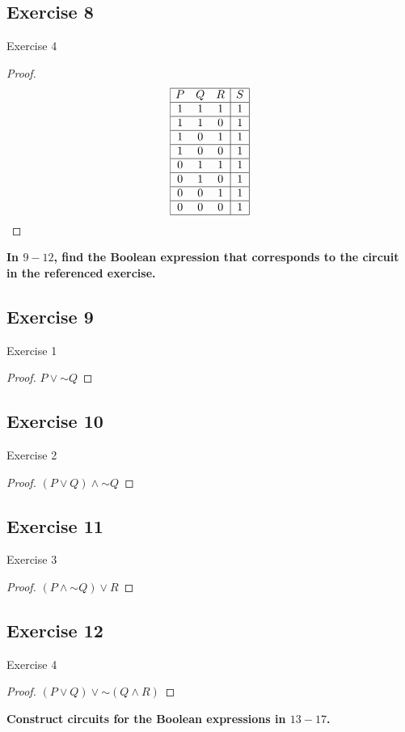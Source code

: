 \documentclass[14pt]{extarticle}
\begin{document}
\subsection{Exercise 8} Exercise 4
\begin{proof} $$ \begin{array}{|ccc|c|} \hline P&Q&R&S\\ \hline 1&1&1&1\\ \hline
1&1&0&1\\ \hline 1&0&1&1\\ \hline 1&0&0&1\\ \hline 0&1&1&1\\ \hline 0&1&0&1\\
\hline 0&0&1&1\\ \hline 0&0&0&1\\ \hline \end{array} $$ \end{proof}

{\bf \color{cyan} In $9-12$, find the Boolean expression that corresponds to the
circuit in the referenced exercise.}

\subsection{Exercise 9} Exercise 1
\begin{proof} $P \vee {\sim Q}$ \end{proof}
\subsection{Exercise 10} Exercise 2
\begin{proof} $(P \vee Q) \wedge {\sim Q}$ \end{proof}
\subsection{Exercise 11} Exercise 3
\begin{proof} $(P \wedge {\sim Q}) \vee R$ \end{proof}
\subsection{Exercise 12} Exercise 4
\begin{proof} $(P \vee Q) \vee {\sim (Q \wedge R)}$ \end{proof}
{\bf \color{cyan} Construct circuits for the Boolean expressions in $13-17$.}
\end{document}
